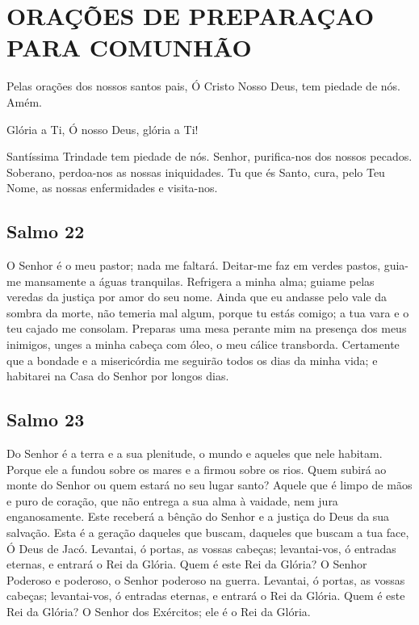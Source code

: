 \documentclass{subfiles}
\begin{document}
\chapter{ORAÇÕES DE PREPARAÇAO PARA COMUNHÃO}

Pelas orações dos nossos santos pais, Ó Cristo Nosso Deus, tem
piedade de nós. Amém.

Glória a Ti, Ó nosso Deus, glória a Ti!

\comforter{}

\trisagion{} \thrice{}

\Doxology{}

Santíssima Trindade tem piedade de nós. Senhor, purifica-nos dos
nossos pecados. Soberano, perdoa-nos as nossas iniquidades. Tu que és Santo,
cura, pelo Teu Nome, as nossas enfermidades e visita-nos.

\mercy{} \thrice{}

\Doxology{}

\ourFather{}

\mercy{} \thrice{}


\section*{Salmo 22}

O Senhor é o meu pastor; nada me faltará. Deitar-me faz em verdes pastos,
guia-me mansamente a águas tranquilas. Refrigera a minha alma; guiame pelas
veredas da justiça por amor do seu nome. Ainda que eu andasse pelo vale da
sombra da morte, não temeria mal algum, porque tu estás comigo; a tua vara e o
teu cajado me consolam. Preparas uma mesa perante mim na presença dos meus
inimigos, unges a minha cabeça com óleo, o meu cálice transborda. Certamente que
a bondade e a misericórdia me seguirão todos os dias da minha vida; e habitarei
na Casa do Senhor por longos dias.

\section*{Salmo 23}

Do Senhor é a terra e a sua plenitude, o mundo e aqueles que nele habitam.
Porque ele a fundou sobre os mares e a firmou sobre os rios. Quem subirá ao
monte do Senhor ou quem estará no seu lugar santo? Aquele que é limpo de mãos e
puro de coração, que não entrega a sua alma à vaidade, nem jura enganosamente.
Este receberá a bênção do Senhor e a justiça do Deus da sua salvação. Esta é a
geração daqueles que buscam, daqueles que buscam a tua face, Ó Deus de Jacó.
Levantai, ó portas, as vossas cabeças; levantai-vos, ó entradas eternas, e
entrará o Rei da Glória. Quem é este Rei da Glória? O Senhor Poderoso e
poderoso, o Senhor poderoso na guerra. Levantai, ó portas, as vossas cabeças;
levantai-vos, ó entradas eternas, e entrará o Rei da Glória. Quem é este Rei da
Glória? O Senhor dos Exércitos; ele é o Rei da Glória.
\end{document}
